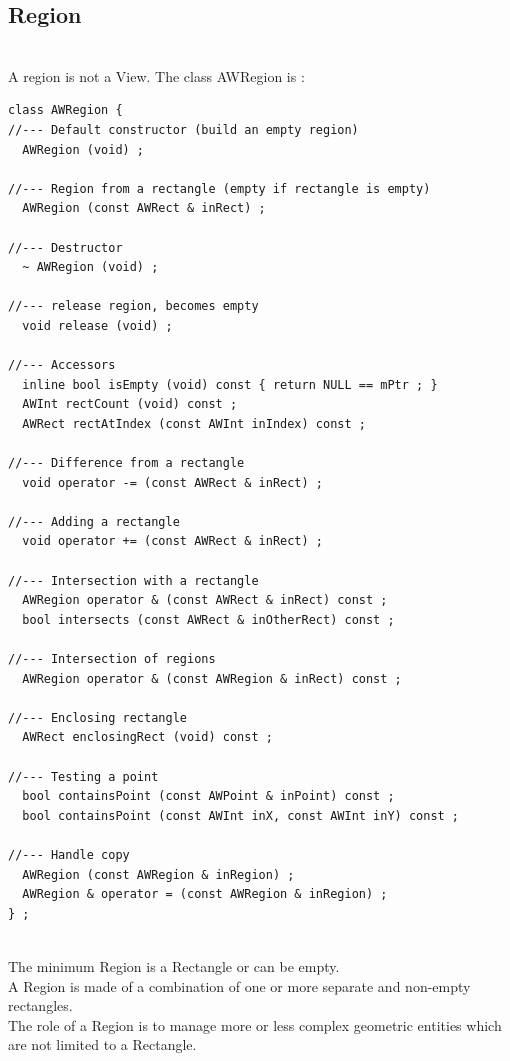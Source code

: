\documentclass[a4paper,11pt]{extarticle}
\begin{document}
\newpage
\subsection{Region}

~\\ A region is not a View. The class AWRegion is :

\begin{lstlisting}[language=Arduinonl]
class AWRegion {
//--- Default constructor (build an empty region)
  AWRegion (void) ;

//--- Region from a rectangle (empty if rectangle is empty)
  AWRegion (const AWRect & inRect) ;

//--- Destructor
  ~ AWRegion (void) ;

//--- release region, becomes empty
  void release (void) ;

//--- Accessors
  inline bool isEmpty (void) const { return NULL == mPtr ; }
  AWInt rectCount (void) const ;
  AWRect rectAtIndex (const AWInt inIndex) const ;

//--- Difference from a rectangle
  void operator -= (const AWRect & inRect) ;

//--- Adding a rectangle
  void operator += (const AWRect & inRect) ;

//--- Intersection with a rectangle
  AWRegion operator & (const AWRect & inRect) const ;
  bool intersects (const AWRect & inOtherRect) const ;

//--- Intersection of regions
  AWRegion operator & (const AWRegion & inRect) const ;

//--- Enclosing rectangle
  AWRect enclosingRect (void) const ;

//--- Testing a point
  bool containsPoint (const AWPoint & inPoint) const ;
  bool containsPoint (const AWInt inX, const AWInt inY) const ;

//--- Handle copy
  AWRegion (const AWRegion & inRegion) ;
  AWRegion & operator = (const AWRegion & inRegion) ;
} ;
\end{lstlisting}

~\\ The minimum Region is a Rectangle or can be empty.
~\\ A Region is made of a combination of one or more separate and non-empty rectangles.
~\\ The role of a Region is to manage more or less complex geometric entities which are not limited to a Rectangle.
\end{document}
